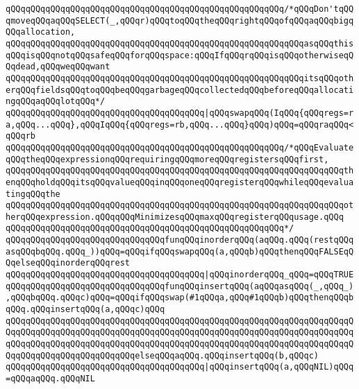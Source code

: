 \verb|qQQqqQQqqQQqqQQqqQQqqQQqqQQqqQQqqQQqqQQqqQQqqQQqqQQqqQQq/*qQQqDon'tqQQqmoveqQQqaqQQqSELECT(_,qQQqr)qQQqtoqQQqtheqQQqrightqQQqofqQQqaqQQqbigqQQqallocation,|\newline
\verb|qQQqqQQqqQQqqQQqqQQqqQQqqQQqqQQqqQQqqQQqqQQqqQQqqQQqqQQqqQQqasqQQqthisqQQqisqQQqnotqQQqsafeqQQqforqQQqspace:qQQqIfqQQqrqQQqisqQQqotherwiseqQQqdead,qQQqweqQQqwant|\newline
\verb|qQQqqQQqqQQqqQQqqQQqqQQqqQQqqQQqqQQqqQQqqQQqqQQqqQQqqQQqqQQqitsqQQqotherqQQqfieldsqQQqtoqQQqbeqQQqgarbageqQQqcollectedqQQqbeforeqQQqallocatingqQQqaqQQqlotqQQq*/|\newline
\verb|qQQqqQQqqQQqqQQqqQQqqQQqqQQqqQQqqQQqqQQq|\verb#|qQQqswapqQQq(IqQQq{qQQqregs=ra,qQQq...qQQq},qQQqIqQQq{qQQqregs=rb,qQQq...qQQq}qQQq)qQQq=qQQqraqQQq<qQQqrb#\newline
\verb|qQQqqQQqqQQqqQQqqQQqqQQqqQQqqQQqqQQqqQQqqQQqqQQqqQQqqQQq/*qQQqEvaluateqQQqtheqQQqexpressionqQQqrequiringqQQqmoreqQQqregistersqQQqfirst,|\newline
\verb|qQQqqQQqqQQqqQQqqQQqqQQqqQQqqQQqqQQqqQQqqQQqqQQqqQQqqQQqqQQqqQQqqQQqthenqQQqholdqQQqitsqQQqvalueqQQqinqQQqoneqQQqregisterqQQqwhileqQQqevaluatingqQQqthe|\newline
\verb|qQQqqQQqqQQqqQQqqQQqqQQqqQQqqQQqqQQqqQQqqQQqqQQqqQQqqQQqqQQqqQQqqQQqotherqQQqexpression.qQQqqQQqMinimizesqQQqmaxqQQqregisterqQQqusage.qQQq|\newline
\verb|qQQqqQQqqQQqqQQqqQQqqQQqqQQqqQQqqQQqqQQqqQQqqQQqqQQqqQQq*/|\newline
\newline
\verb|qQQqqQQqqQQqqQQqqQQqqQQqqQQqqQQqfunqQQqinorderqQQq(aqQQq.qQQq(restqQQqasqQQqbqQQq.qQQq_))qQQq=qQQqifqQQqswapqQQq(a,qQQqb)qQQqthenqQQqFALSEqQQqelseqQQqinorderqQQqrest|\newline
\verb|qQQqqQQqqQQqqQQqqQQqqQQqqQQqqQQqqQQqqQQq|\verb#|qQQqinorderqQQq_qQQq=qQQqTRUE#\newline
\newline
\verb|qQQqqQQqqQQqqQQqqQQqqQQqqQQqqQQqfunqQQqinsertqQQq(aqQQqasqQQq(_,qQQq_),qQQqbqQQq.qQQqc)qQQq=qQQqifqQQqswap(#1qQQqa,qQQq#1qQQqb)qQQqthenqQQqbqQQq.qQQqinsertqQQq(a,qQQqc)qQQq|\newline
\verb|qQQqqQQqqQQqqQQqqQQqqQQqqQQqqQQqqQQqqQQqqQQqqQQqqQQqqQQqqQQqqQQqqQQqqQQqqQQqqQQqqQQqqQQqqQQqqQQqqQQqqQQqqQQqqQQqqQQqqQQqqQQqqQQqqQQqqQQqqQQqqQQqqQQqqQQqqQQqqQQqqQQqqQQqqQQqqQQqqQQqqQQqqQQqqQQqqQQqqQQqqQQqqQQqqQQqqQQqqQQqqQQqqQQqqQQqqQQqelseqQQqaqQQq.qQQqinsertqQQq(b,qQQqc)|\newline
\verb|qQQqqQQqqQQqqQQqqQQqqQQqqQQqqQQqqQQqqQQq|\verb#|qQQqinsertqQQq(a,qQQqNIL)qQQq=qQQqaqQQq.qQQqNIL#\newline

